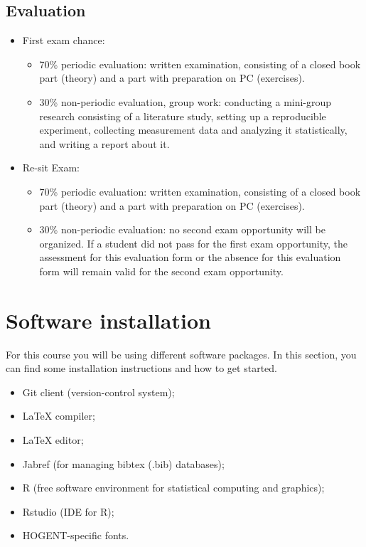 \subsection{Evaluation}

\begin{itemize}
    \item First exam chance:
    \begin{itemize}
        \item 70\% periodic evaluation: written examination, consisting of a closed book part (theory) and a part with preparation on PC (exercises).
        \item 30\% non-periodic evaluation, group work: conducting a mini-group research consisting of a literature study, setting up a reproducible experiment, collecting measurement data and analyzing it statistically, and writing a report about it.
    \end{itemize}
    \item Re-sit Exam:
    \begin{itemize}
        \item 70\% periodic evaluation: written examination, consisting of a closed book part (theory) and a part with preparation on PC (exercises).
        \item 30\% non-periodic evaluation: no second exam opportunity will be organized. If a student did not pass for the first exam opportunity, the assessment for this evaluation form or the absence for this evaluation form will remain valid for the second exam opportunity.
    \end{itemize}
\end{itemize}

\section{Software installation}
\label{sec:installatie-software}

For this course you will be using different software packages. In this section, you can find some installation instructions and how to get started.

\begin{itemize}
    \item Git client (version-control system);
    \item \LaTeX{} compiler;
    \item \LaTeX{} editor;
    \item Jabref (for managing bibtex (.bib) databases);
    \item R (free software environment for statistical computing and graphics);
    \item Rstudio (IDE for R);
    \item HOGENT-specific fonts.
\end{itemize}

